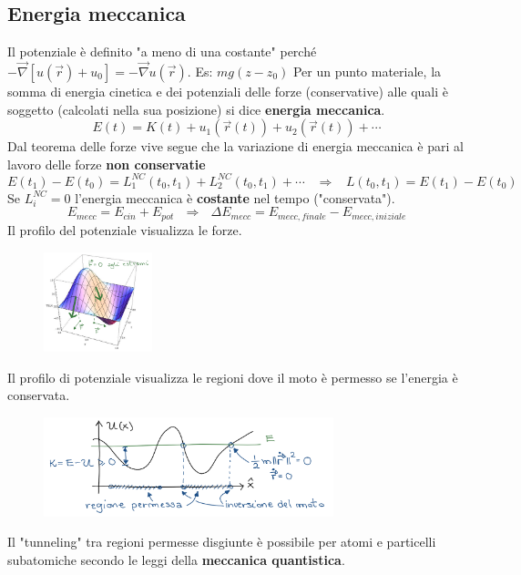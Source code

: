 \subsection{Energia meccanica}
Il potenziale è definito "a meno di una costante" perché $-\vec{\nabla}[u(\vec{r}) + u_0] = -\vec{\nabla}u(\vec{r})$. Es: $mg(z-z_0)$
Per un punto materiale, la somma di energia cinetica e dei potenziali delle forze (conservative) alle quali è soggetto (calcolati nella sua posizione) si 
dice \textbf{energia meccanica}.
$$E(t) = K(t) + u_1(\vec{r}(t)) + u_2(\vec{r}(t)) + \cdots$$
Dal teorema delle forze vive segue che la variazione di energia meccanica è pari al lavoro delle forze \textbf{non conservatie}
$$E(t_1) - E(t_0) = L_1^{NC}(t_0, t_1) + L_2^{NC}(t_0, t_1) + \cdots \hspace{10pt} \Rightarrow \hspace{10pt} L(t_0, t_1) = E(t_1) - E(t_0)$$
Se $L_i^{NC} = 0$ l'energia meccanica è \textbf{costante} nel tempo ("conservata").
$$E_{mecc} = E_{cin} + E_{pot} \:\:\: \Rightarrow \:\:\: \Delta E_{mecc} = E_{mecc,finale} - E_{mecc, iniziale}$$
Il profilo del potenziale visualizza le forze.
\begin{figure}[h!]
    \centering
    \includegraphics[width=0.28\textwidth]{images/profilo-potenziale.png}
\end{figure}
\newpage
Il profilo di potenziale visualizza le regioni dove il moto è permesso se l'energia è conservata.
\begin{figure}[h!]
    \centering
    \includegraphics[width=0.75\textwidth]{images/regioni-permesse-profilo-potenziale.png}
\end{figure}
\begin{observation}
    Il "tunneling" tra regioni permesse disgiunte è possibile per atomi e particelli subatomiche secondo
    le leggi della \textbf{meccanica quantistica}.
\end{observation}

